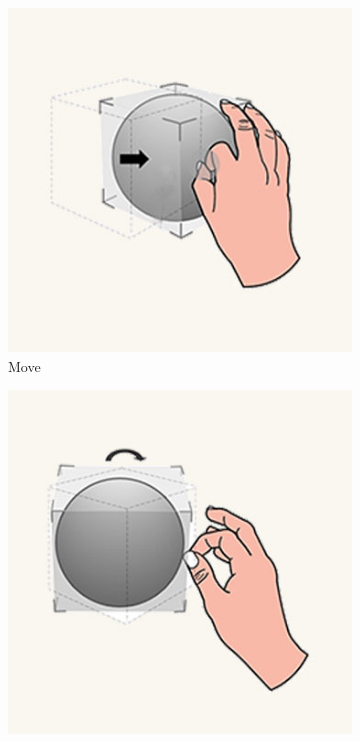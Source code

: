 \begin{enumerate}
    \begin{figure}[!ht]
        \centering
        \begin{subfigure}{0.3\textwidth}
            \centering
            \includegraphics[width=0.9\linewidth]{images/hololens_interaction_move.jpg}
            \caption{Move}\label{fig:hololensInteractionMove}
        \end{subfigure}%
        \begin{subfigure}{0.3\textwidth}
            \centering
            \includegraphics[width=0.9\linewidth]{images/hololens_interaction_rotate.jpg}

\end{subfigure}
\end{figure}
\end{enumerate}
